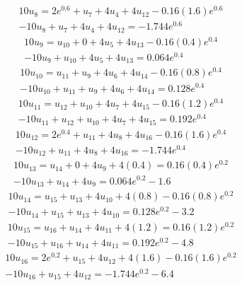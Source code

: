\documentclass[11pt]{article}
\numberwithin{equation}{section}
\begin{document}
\begin{align}
	10u_8 = 2e^{0.6} + u_7 + 4u_4 +4u_{12} -0.16(1.6)e^{0.6}\\
	-10u_8 + u_7 + 4u_4 + 4u_{12} = -1.744e^{0.6}
\end{align}
\begin{align}
	10u_9 = u_{10} + 0 + 4u_5 + 4u_{13} -0.16(0.4)e^{0.4}\\
	-10u_9 + u_{10} + 4u_5 + 4u_{13} = 0.064e^{0.4}
\end{align}
\begin{align}
	10u_{10} = u_{11} + u_9 + 4u_6 + 4u_{14}-0.16(0.8)e^{0.4}\\
	-10u_{10} + u_{11} +u_9 + 4u_{6} + 4u_{14} = 0.128e^{0.4}
\end{align}
\begin{align}
	10u_{11} = u_{12} + u_{10} + 4u_7 + 4u_{15} -0.16(1.2)e^{0.4}\\
	-10u_{11} + u_{12} + u_{10} + 4u_7 + 4u_{15} = 0.192e^{0.4}
\end{align}
\begin{align}
	10u_{12} = 2e^{0.4} + u_{11} + 4u_8 + 4u_{16} -0.16(1.6)e^{0.4}\\
	-10u_{12} + u_{11} + 4u_8 + 4u_{16} = -1.744e^{0.4}
\end{align}
\begin{align}
	10u_{13} = u_{14} + 0 + 4u_9 + 4(0.4) = 0.16(0.4)e^{0.2}\\
	-10u_{13} + u_{14} + 4u_9 = 0.064e^{0.2} - 1.6
\end{align}
\begin{align}
	10u_{14} = u_{15} + u_{13} + 4u_{10} + 4(0.8) -0.16(0.8)e^{0.2}\\
	-10u_{14} + u_{15} + u_{13} + 4u_{10} = 0.128e^{0.2}-3.2
\end{align}
\begin{align}
	10u_{15} = u_{16} + u_{14} + 4u_{11} + 4(1.2) = 0.16(1.2)e^{0.2}\\
	-10u_{15} + u_{16} + u_{14} + 4u_{11} = 0.192e^{0.2} - 4.8
\end{align}
\begin{align}
	10u_{16} = 2e^{0.2} + u_{15} + 4u_{12} + 4(1.6) -0.16(1.6)e^{0.2}\\
	-10u_{16} + u_{15} + 4u_{12} = -1.744e^{0.2} - 6.4
\end{align}

\newpage
\end{document}
